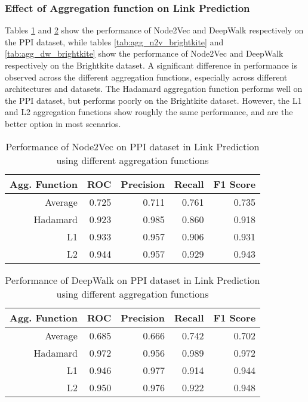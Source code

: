 \documentclass[sigconf]{acmart}
\begin{document}
\subsubsection{Effect of Aggregation function on Link Prediction}

Tables \ref{tab:agg_n2v_ppi} and \ref{tab:agg_dw_ppi} show the performance of Node2Vec and DeepWalk respectively on the PPI dataset, while tables \ref{tab:agg_n2v_brightkite} and \ref{tab:agg_dw_brightkite} show the performance of Node2Vec and DeepWalk respectively on the Brightkite dataset. A significant difference in performance is observed across the different aggregation functions, especially across different architectures and datasets. The Hadamard aggregation function performs well on the PPI dataset, but performs poorly on the Brightkite dataset. However, the L1 and L2 aggregation functions show roughly the same performance, and are the better option in most scenarios.
\begin{table}[H]
\begin{tabular}{|r|r|r|r|r|}
\hline
\textbf{Agg. Function} & \textbf{ROC} & \textbf{Precision} & \textbf{Recall} & \textbf{F1 Score}\\
\hline
Average & 0.725 & 0.711 & 0.761 & 0.735\\
Hadamard & 0.923 & 0.985 & 0.860 & 0.918\\
L1 & 0.933 & 0.957 & 0.906 & 0.931\\
L2 & 0.944 & 0.957 & 0.929 & 0.943\\
\hline
\end{tabular}
\caption{Performance of Node2Vec on PPI dataset in Link Prediction using different aggregation functions}
\label{tab:agg_n2v_ppi}
\end{table}


\begin{table}[H]
\begin{tabular}{|r|r|r|r|r|}
\hline
\textbf{Agg. Function} & \textbf{ROC} & \textbf{Precision} & \textbf{Recall} & \textbf{F1 Score}\\
\hline
Average & 0.685 & 0.666 & 0.742 & 0.702\\
Hadamard & 0.972 & 0.956 & 0.989 & 0.972\\
L1 & 0.946 & 0.977 & 0.914 & 0.944\\
L2 & 0.950 & 0.976 & 0.922 & 0.948\\
\hline
\end{tabular}
\caption{Performance of DeepWalk on PPI dataset in Link Prediction using different aggregation functions}
\label{tab:agg_dw_ppi}
\end{table}
\end{document}
